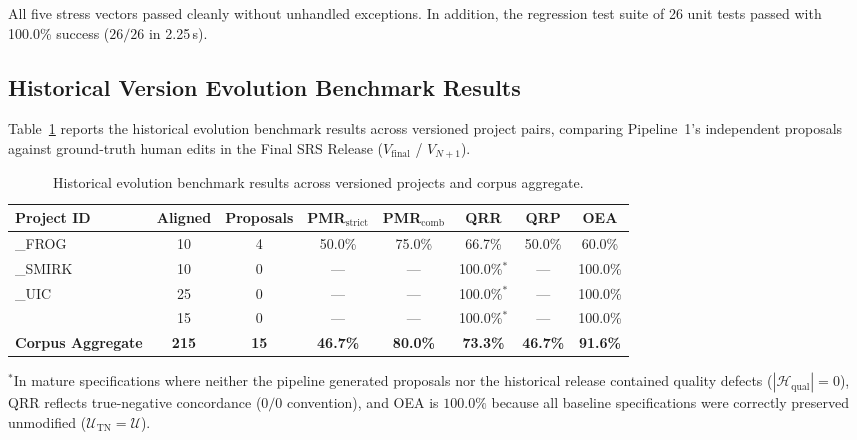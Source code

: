 \documentclass[journal]{IEEEtran}
\begin{document}
All five stress vectors passed cleanly without unhandled exceptions. In addition, the regression test suite of 26 unit tests passed with 100.0\% success ($26/26$ in 2.25\,s).

\subsection{Historical Version Evolution Benchmark Results}
\label{sec:evolution-results}

Table~\ref{tab:evolution-results} reports the historical evolution benchmark results across versioned project pairs, comparing Pipeline~1's independent proposals against ground-truth human edits in the Final SRS Release ($V_{\text{final}}$ / $V_{N+1}$).

\begin{table}[htbp]
\centering
\caption{Historical evolution benchmark results across versioned projects and corpus aggregate.}
\label{tab:evolution-results}
\small
\setlength{\tabcolsep}{2.5pt}
\begin{tabularx}{\columnwidth}{@{}>{\raggedright\arraybackslash}Xccccccc@{}}
\toprule
\textbf{Project ID} & \textbf{Aligned} & \textbf{Proposals} & \textbf{PMR$_{\text{strict}}$} & \textbf{PMR$_{\text{comb}}$} & \textbf{QRR} & \textbf{QRP} & \textbf{OEA} \\
\midrule
1\_FROG   & 10 & 4 & 50.0\% & 75.0\%  & 66.7\% & 50.0\% & 60.0\% \\
2\_SMIRK  & 10 & 0 & ---    & ---     & 100.0\%$^*$ & ---    & 100.0\% \\
4\_UIC    & 25 & 0 & ---    & ---     & 100.0\%$^*$ & ---    & 100.0\% \\
15        & 15 & 0 & ---    & ---     & 100.0\%$^*$ & ---    & 100.0\% \\
\midrule
\textbf{Corpus Aggregate} & \textbf{215} & \textbf{15} & \textbf{46.7\%} & \textbf{80.0\%} & \textbf{73.3\%} & \textbf{46.7\%} & \textbf{91.6\%} \\
\bottomrule
\end{tabularx}
\vspace{1pt}
\flushleft
\scriptsize{$^*$In mature specifications where neither the pipeline generated proposals nor the historical release contained quality defects ($|\mathcal{H}_{\text{qual}}| = 0$), QRR reflects true-negative concordance ($0/0$ convention), and OEA is $100.0\%$ because all baseline specifications were correctly preserved unmodified ($\mathcal{U}_{\text{TN}} = \mathcal{U}$).}
\end{table}
\end{document}
